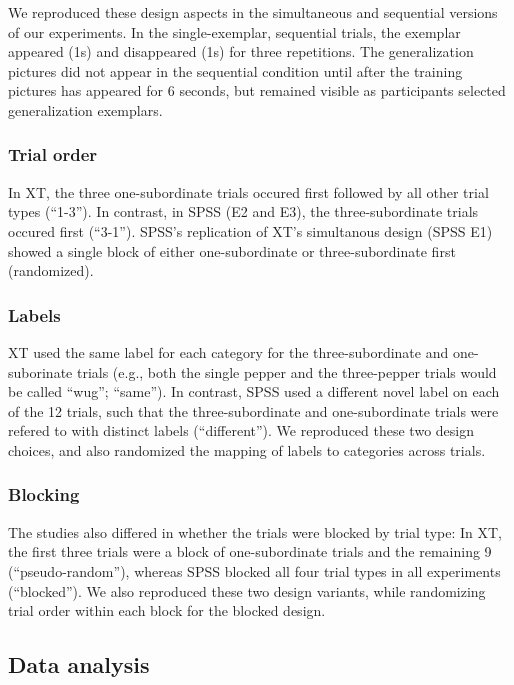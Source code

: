 \documentclass[english,floatsintext,man]{apa6}
\theoremstyle{definition}
\theoremstyle{definition}
\theoremstyle{remark}
\begin{document}
We reproduced these design aspects in the simultaneous and sequential
versions of our experiments. In the single-exemplar, sequential trials,
the exemplar appeared (1s) and disappeared (1s) for three repetitions.
The generalization pictures did not appear in the sequential condition
until after the training pictures has appeared for 6 seconds, but
remained visible as participants selected generalization exemplars.

\subsubsection{Trial order}\label{trial-order}

In XT, the three one-subordinate trials occured first followed by all
other trial types (\enquote{1-3}). In contrast, in SPSS (E2 and E3), the
three-subordinate trials occured first (\enquote{3-1}). SPSS's
replication of XT's simultanous design (SPSS E1) showed a single block
of either one-subordinate or three-subordinate first (randomized).

\subsubsection{Labels}\label{labels}

XT used the same label for each category for the three-subordinate and
one-suborinate trials (e.g., both the single pepper and the three-pepper
trials would be called \enquote{wug}; \enquote{same}). In contrast, SPSS
used a different novel label on each of the 12 trials, such that the
three-subordinate and one-subordinate trials were refered to with
distinct labels (\enquote{different}). We reproduced these two design
choices, and also randomized the mapping of labels to categories across
trials.

\subsubsection{Blocking}\label{blocking}

The studies also differed in whether the trials were blocked by trial
type: In XT, the first three trials were a block of one-subordinate
trials and the remaining 9 (\enquote{pseudo-random}), whereas SPSS
blocked all four trial types in all experiments (\enquote{blocked}). We
also reproduced these two design variants, while randomizing trial order
within each block for the blocked design.

\subsection{Data analysis}\label{data-analysis}
\end{document}
